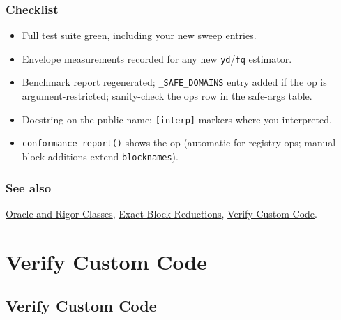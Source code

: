 \subsection{Checklist}



\label{12063979991204939893}{}


\begin{itemize}
\item Full test suite green, including your new sweep entries.


\item Envelope measurements recorded for any new \texttt{yd}/\allowbreak\texttt{fq} estimator.


\item Benchmark report regenerated; \texttt{\_\allowbreak{}SAFE\_\allowbreak{}DOMAINS} entry added if the op is argument-restricted; sanity-check the op{\textquotesingle}s row in the safe-args table.


\item Docstring on the public name; \texttt{[interp]} markers where you interpreted.


\item \texttt{conformance\_\allowbreak{}report()} shows the op (automatic for registry ops; manual block additions extend \texttt{blocknames}).

\end{itemize}


\subsection{See also}



\label{292862844209942199-dup22}{}


\href{internals\_\allowbreak{}oracle.md}{Oracle and Rigor Classes}, \href{internals\_\allowbreak{}blocks.md}{Exact Block Reductions}, \href{internals\_\allowbreak{}verify\_\allowbreak{}custom.md}{Verify Custom Code}.



\chapter{Verify Custom Code}


\section{Verify Custom Code}



